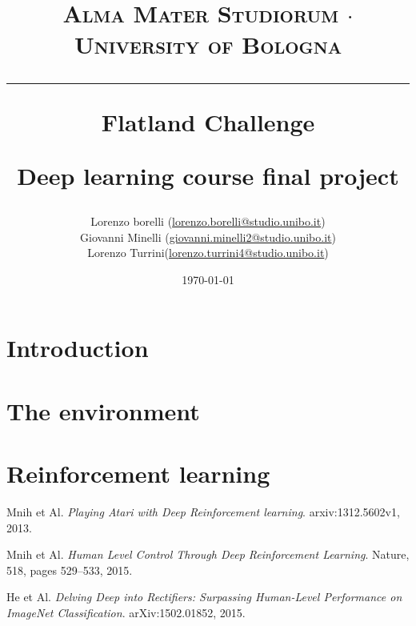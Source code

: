 \documentclass[a4paper,14pt]{extreport}
\begin{document}
\title{
	{{\large{\textsc{Alma Mater Studiorum $\cdot$ University of Bologna}}}}
	\rule{\textwidth}{0.4pt}\vspace{3mm}
	\textbf{Flatland Challenge}
	
	Deep learning course final project
}

\author{Lorenzo borelli (\href{mailto:lorenzo.borelli@studio.unibo.it}{lorenzo.borelli@studio.unibo.it}) 
\\ Giovanni Minelli (\href{mailto:giovanni.minelli2@studio.unibo.it}{giovanni.minelli2@studio.unibo.it}) 
\\ Lorenzo Turrini(\href{mailto:lorenzo.turrini4@studio.unibo.it}{lorenzo.turrini4@studio.unibo.it})}
\date{\today}
\maketitle
\newpage
\tableofcontents
\setcounter{tocdepth}{1}
\listoffigures
\listoftables
\newpage

\chapter{Introduction}


\chapter{The environment}



\chapter{Reinforcement learning}


\begin{thebibliography}{9}

	
	Mnih et Al.
	\textit{Playing Atari with Deep Reinforcement learning}. 
	arxiv:1312.5602v1, 2013.
	
	Mnih et Al.
	\textit{Human Level Control Through Deep Reinforcement Learning}. 
	Nature, 518, pages 529–533, 2015.

	He et Al.
	\textit{Delving Deep into Rectifiers: Surpassing Human-Level Performance on ImageNet Classification}. 
	 arXiv:1502.01852, 2015.

\end{thebibliography}
\end{document}
